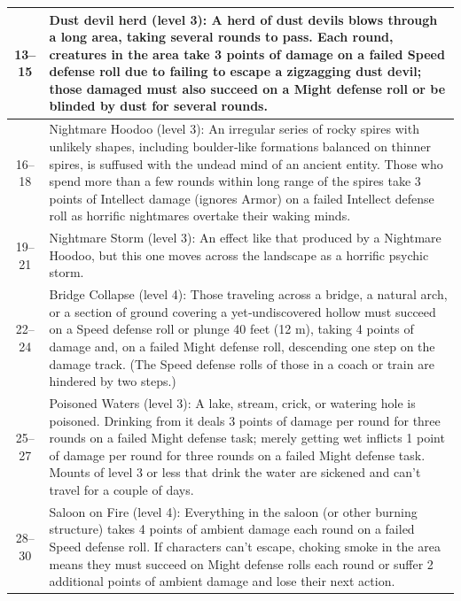 \begin{longtable}{| c | p{15cm} |}
13–15 &  Dust devil herd (level 3): A herd of dust devils blows through a long area, taking several rounds to pass. Each round, creatures in the area take 3 points of damage on a failed Speed defense roll due to failing to escape a zigzagging dust devil; those damaged must also succeed on a Might defense roll or be blinded by dust for several rounds. \\ \hline

16–18 &  Nightmare Hoodoo (level 3): An irregular series of rocky spires with unlikely shapes, including boulder‑like formations balanced on thinner spires, is suffused with the undead mind of an ancient entity. Those who spend more than a few rounds within long range of the spires take 3 points of Intellect damage (ignores Armor) on a failed Intellect defense roll as horrific nightmares overtake their waking minds. \\ \hline

19–21 &  Nightmare Storm (level 3): An effect like that produced by a Nightmare Hoodoo, but this one moves across the landscape as a horrific psychic storm.  \\ \hline

22–24 &  Bridge Collapse (level 4): Those traveling across a bridge, a natural arch, or a section of ground covering a yet‑undiscovered hollow must succeed on a Speed defense roll or plunge 40 feet (12 m), taking 4 points of damage and, on a failed Might defense roll, descending one step on the damage track. (The Speed defense rolls of those in a coach or train are hindered by two steps.) \\ \hline

25–27 &  Poisoned Waters (level 3): A lake, stream, crick, or watering hole is poisoned. Drinking from it deals 3 points of damage per round for three rounds on a failed Might defense task; merely getting wet inflicts 1 point of damage per round for three rounds on a failed Might defense task. Mounts of level 3 or less that drink the water are sickened and can’t travel for a couple of days.  \\ \hline

28–30 &  Saloon on Fire (level 4): Everything in the saloon (or other burning structure) takes 4 points of ambient damage each round on a failed Speed defense roll. If characters can’t escape, choking smoke in the area means they must succeed on Might defense rolls each round or suffer 2 additional points of ambient damage and lose their next action. \\ \hline


\end{longtable}
